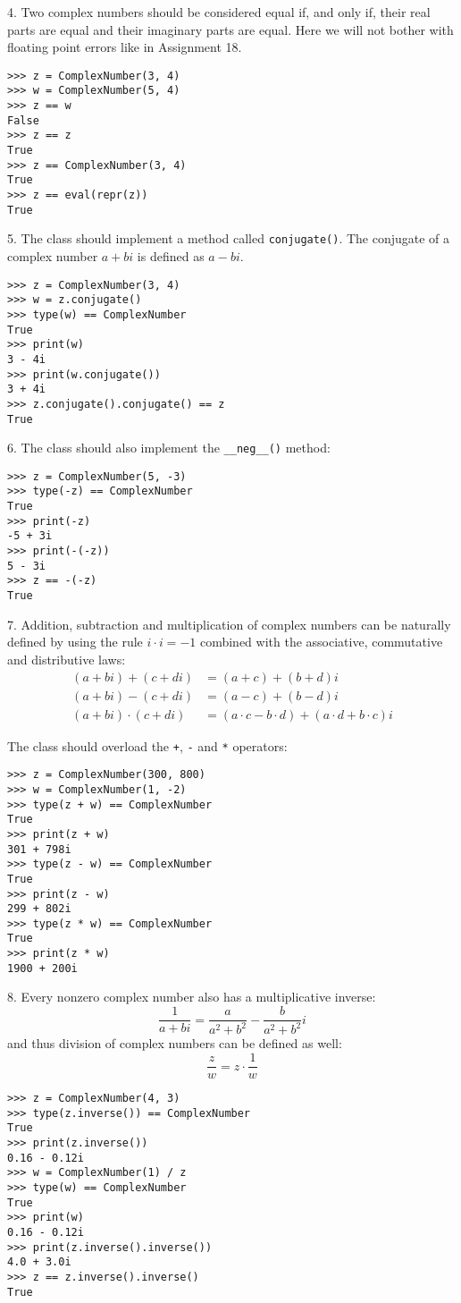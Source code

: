 4. Two complex numbers should be considered equal if, and only if,
their real parts are equal and their imaginary parts are equal.
Here we will not bother with floating point errors like in Assignment 18.
\begin{verbatim}
>>> z = ComplexNumber(3, 4)
>>> w = ComplexNumber(5, 4)
>>> z == w
False
>>> z == z
True
>>> z == ComplexNumber(3, 4)
True
>>> z == eval(repr(z))
True
\end{verbatim}

5. The class should implement a method called \texttt{conjugate()}.
The conjugate of a complex number $a + bi$ is defined as $a - bi$.
\begin{verbatim}
>>> z = ComplexNumber(3, 4)
>>> w = z.conjugate()
>>> type(w) == ComplexNumber
True
>>> print(w)
3 - 4i
>>> print(w.conjugate())
3 + 4i
>>> z.conjugate().conjugate() == z
True
\end{verbatim}

6. The class should also implement the \texttt{\_\_neg\_\_()} method:
\begin{verbatim}
>>> z = ComplexNumber(5, -3)
>>> type(-z) == ComplexNumber
True
>>> print(-z)
-5 + 3i
>>> print(-(-z))
5 - 3i
>>> z == -(-z)
True
\end{verbatim}

7. Addition, subtraction and multiplication of complex numbers
can be naturally defined by using the rule
$i \cdot i = -1$
combined with the associative, commutative and distributive laws:
\begin{align*}
(a + bi) + (c + di) &= (a + c) + (b + d)i \\
(a + bi) - (c + di) &= (a - c) + (b - d)i \\
(a + bi) \cdot (c + di) &= (a \cdot c - b \cdot d) + (a \cdot d + b \cdot c)i
\end{align*}

The class should overload the \texttt{+}, \texttt{-} and \texttt{*} operators:
\begin{verbatim}
>>> z = ComplexNumber(300, 800)
>>> w = ComplexNumber(1, -2)
>>> type(z + w) == ComplexNumber
True
>>> print(z + w)
301 + 798i
>>> type(z - w) == ComplexNumber
True
>>> print(z - w)
299 + 802i
>>> type(z * w) == ComplexNumber
True
>>> print(z * w)
1900 + 200i
\end{verbatim}

8. Every nonzero complex number also has a multiplicative inverse:
\[\frac{1}{a + bi} = \frac{a}{a^2 + b^2} - \frac{b}{a^2 + b^2}i\]
and thus division of complex numbers can be defined as well:
\[\frac{z}{w} = z \cdot \frac{1}{w}\]
\begin{verbatim}
>>> z = ComplexNumber(4, 3)
>>> type(z.inverse()) == ComplexNumber
True
>>> print(z.inverse())
0.16 - 0.12i
>>> w = ComplexNumber(1) / z
>>> type(w) == ComplexNumber
True
>>> print(w)
0.16 - 0.12i
>>> print(z.inverse().inverse())
4.0 + 3.0i
>>> z == z.inverse().inverse()
True
\end{verbatim}

